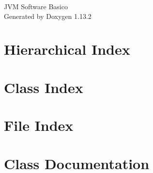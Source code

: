 \documentclass[twoside]{book}
\newcommand{\+}{\discretionary{\mbox{\scriptsize$\hookleftarrow$}}{}{}}
\newcommand{\clearemptydoublepage}{%
    \newpage{\pagestyle{empty}\cleardoublepage}%
  }
\begin{document}
  \raggedbottom
    \hypersetup{pageanchor=false,
                bookmarksnumbered=true,
                pdfencoding=unicode
               }
  \begin{titlepage}
  \vspace*{7cm}
  \begin{center}%
  {\Large JVM Software Basico}\\
  \vspace*{1cm}
  {\large Generated by Doxygen 1.13.2}\\
  \end{center}
  \end{titlepage}
  \clearemptydoublepage
  \tableofcontents
  \clearemptydoublepage
  \hypersetup{pageanchor=true}

\chapter{Hierarchical Index}

\chapter{Class Index}

\chapter{File Index}

\chapter{Class Documentation}











































\end{document}
